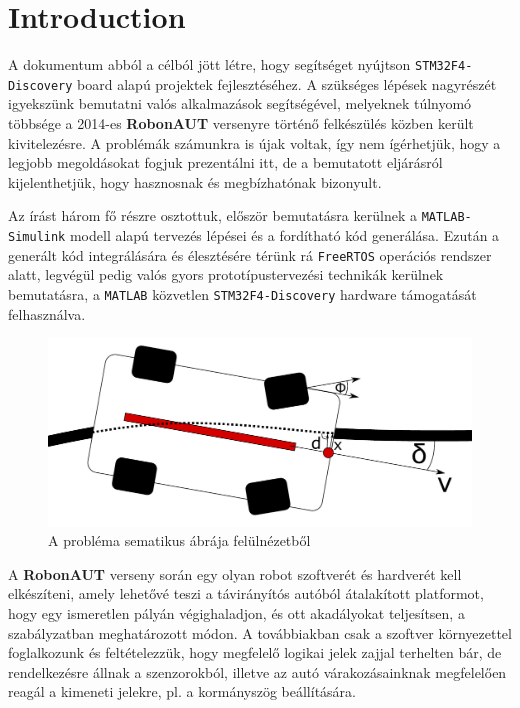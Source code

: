 \section{Introduction}
\label{sec:Introdu}

A dokumentum abból a célból jött létre, hogy segítséget nyújtson \verb!STM32F4-Discovery! board alapú projektek fejlesztéséhez. A szükséges lépések nagyrészét igyekszünk bemutatni valós alkalmazások segítségével, melyeknek túlnyomó többsége a 2014-es \textbf{RobonAUT} versenyre történő felkészülés közben került kivitelezésre. A problémák számunkra is újak voltak, így nem ígérhetjük, hogy a legjobb megoldásokat fogjuk prezentálni itt, de a bemutatott eljárásról kijelenthetjük, hogy hasznosnak és megbízhatónak bizonyult.

Az írást három fő részre osztottuk, először bemutatásra kerülnek a \verb!MATLAB-Simulink! modell alapú tervezés lépései és a fordítható kód generálása. Ezután a generált kód integrálására és élesztésére térünk rá \verb!FreeRTOS! operációs rendszer alatt, legvégül pedig valós gyors prototípustervezési technikák kerülnek bemutatásra, a \verb!MATLAB! közvetlen \verb!STM32F4-Discovery! hardware támogatását felhasználva.

\begin{figure}[!ht]
    \centering
    \includegraphics[width=0.9\linewidth]{img/cartop}
    \caption{A probléma sematikus ábrája felülnézetből}
    \label{fig:cartop}
\end{figure}

A \textbf{RobonAUT} verseny során egy olyan robot szoftverét és hardverét kell elkészíteni, amely lehetővé teszi a távirányítós autóból átalakított platformot, hogy egy ismeretlen pályán végighaladjon, és ott akadályokat teljesítsen, a szabályzatban meghatározott módon. A továbbiakban csak a szoftver környezettel foglalkozunk és feltételezzük, hogy megfelelő logikai jelek zajjal terhelten bár, de rendelkezésre állnak a szenzorokból, illetve az autó várakozásainknak megfelelően reagál a kimeneti jelekre, pl. a kormányszög beállítására.

